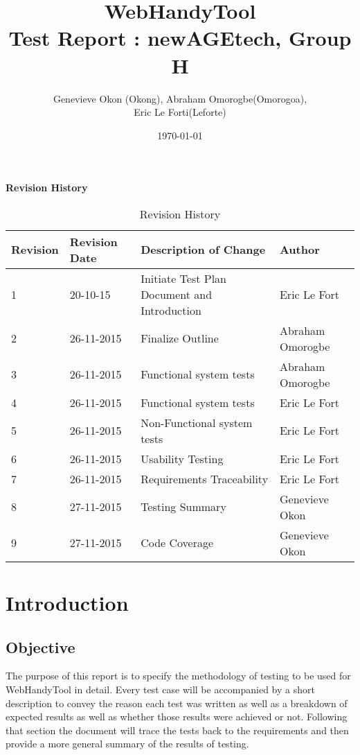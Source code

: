 \documentclass[12pt, titlepage]{article}
\begin{document}
\title{WebHandyTool \\
 Test Report : newAGEtech, Group H }
\author{Genevieve Okon (Okong), Abraham Omorogbe(Omorogoa),\\
 Eric Le Forti(Leforte)}
\date{\today}
\maketitle

\tableofcontents
\listoftables
\pagebreak

\begin{center}\textbf{Revision History}\end{center}
\begin{table}[h!]
\centering
	\begin{tabular}{| p{1.5cm} | p{2.5cm} | p{7cm} |p{3cm} |}    \hline
	Revision  &Revision Date &Description of Change &Author\\ \hline
	1& 20-10-15 &Initiate Test Plan Document  and Introduction&Eric Le Fort\\ \hline
	2&26-11-2015&Finalize Outline & Abraham Omorogbe\\ \hline	
3&26-11-2015&Functional system tests& Abraham Omorogbe\\ \hline
4&26-11-2015&Functional system tests& Eric Le Fort\\ \hline
5&26-11-2015&Non-Functional system tests& Eric Le Fort\\ \hline
6 &26-11-2015&Usability Testing & Eric Le Fort\\ \hline
7& 26-11-2015& Requirements Traceability & Eric Le Fort\\ \hline
8& 27-11-2015 &Testing Summary& Genevieve Okon\\ \hline
9& 27-11-2015 &Code Coverage& Genevieve Okon\\ \hline

	
       \end{tabular}
       \caption{Revision History}
       \label{table:Revision History}
\end{table}





\section{Introduction}
\subsection{Objective}
The purpose of this report is to specify the methodology of testing to be used for WebHandyTool in detail. Every test case will be accompanied by a short description to convey the reason each test was written as well as a breakdown of expected results as well as whether those results were achieved or not. Following that section the document will trace the tests back to the requirements and then provide a more general summary of the results of testing.
\end{document}
